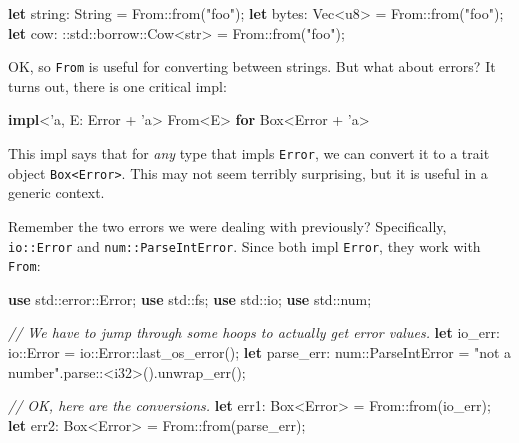 \documentclass[a4paper,]{book}
\newenvironment{Shaded}{\begin{snugshade}}{\end{snugshade}}
\newcommand{\KeywordTok}[1]{\textcolor[rgb]{0.13,0.29,0.53}{\textbf{{#1}}}}
\newcommand{\DataTypeTok}[1]{\textcolor[rgb]{0.13,0.29,0.53}{{#1}}}
\newcommand{\StringTok}[1]{\textcolor[rgb]{0.31,0.60,0.02}{{#1}}}
\newcommand{\CommentTok}[1]{\textcolor[rgb]{0.56,0.35,0.01}{\textit{{#1}}}}
\newcommand{\OtherTok}[1]{\textcolor[rgb]{0.56,0.35,0.01}{{#1}}}
\newcommand{\NormalTok}[1]{{#1}}
\begin{document}
\begin{Shaded}
\begin{Highlighting}[]
\KeywordTok{let} \NormalTok{string: }\DataTypeTok{String} \NormalTok{= From::from(}\StringTok{"foo"}\NormalTok{);}
\KeywordTok{let} \NormalTok{bytes: }\DataTypeTok{Vec}\NormalTok{<}\DataTypeTok{u8}\NormalTok{> = From::from(}\StringTok{"foo"}\NormalTok{);}
\KeywordTok{let} \NormalTok{cow: ::std::borrow::Cow<}\DataTypeTok{str}\NormalTok{> = From::from(}\StringTok{"foo"}\NormalTok{);}
\end{Highlighting}
\end{Shaded}

OK, so \texttt{From} is useful for converting between strings. But what
about errors? It turns out, there is one critical impl:

\begin{Shaded}
\begin{Highlighting}[]
\KeywordTok{impl}\NormalTok{<}\OtherTok{'a}\NormalTok{, E: Error + }\OtherTok{'a}\NormalTok{> From<E> }\KeywordTok{for} \DataTypeTok{Box}\NormalTok{<Error + }\OtherTok{'a}\NormalTok{>}
\end{Highlighting}
\end{Shaded}

This impl says that for \emph{any} type that impls \texttt{Error}, we
can convert it to a trait object
\texttt{Box\textless{}Error\textgreater{}}. This may not seem terribly
surprising, but it is useful in a generic context.

Remember the two errors we were dealing with previously? Specifically,
\texttt{io::Error} and \texttt{num::ParseIntError}. Since both impl
\texttt{Error}, they work with \texttt{From}:

\begin{Shaded}
\begin{Highlighting}[]
\KeywordTok{use} \NormalTok{std::error::Error;}
\KeywordTok{use} \NormalTok{std::fs;}
\KeywordTok{use} \NormalTok{std::io;}
\KeywordTok{use} \NormalTok{std::num;}

\CommentTok{// We have to jump through some hoops to actually get error values.}
\KeywordTok{let} \NormalTok{io_err: io::Error = io::Error::last_os_error();}
\KeywordTok{let} \NormalTok{parse_err: num::ParseIntError = }\StringTok{"not a number"}\NormalTok{.parse::<}\DataTypeTok{i32}\NormalTok{>().unwrap_err();}

\CommentTok{// OK, here are the conversions.}
\KeywordTok{let} \NormalTok{err1: }\DataTypeTok{Box}\NormalTok{<Error> = From::from(io_err);}
\KeywordTok{let} \NormalTok{err2: }\DataTypeTok{Box}\NormalTok{<Error> = From::from(parse_err);}
\end{Highlighting}
\end{Shaded}
\end{document}
